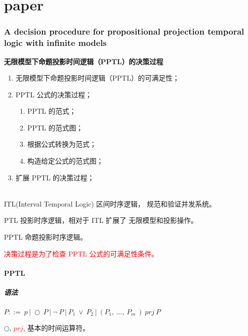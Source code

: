 \part{paper}

\section{A decision procedure for propositional projection
temporal logic with infinite models}
\textbf{无限模型下命题投影时间逻辑（PPTL）的决策过程}

\begin{enumerate}[(1)]
  \item 无限模型下命题投影时间逻辑（PPTL）的可满足性；
  \item PPTL 公式的决策过程；
  \begin{enumerate}
    \item PPTL 的范式；
    \item PPTL 的范式图；
    \item 根据公式转换为范式；
    \item 构造给定公式的范式图；
  \end{enumerate}
  \item 扩展 PPTL 的决策过程；
\end{enumerate}

\noindent
{}\\
\noindent ITL(Interval Temporal Logic) 区间时序逻辑， 规范和验证并发系统。

\noindent PTL 投影时序逻辑，相对于 ITL 扩展了 无限模型和投影操作。

\noindent PPTL 命题投影时序逻辑。


\noindent\textcolor{red}{决策过程是为了检查 PPTL 公式的可满足性条件。}


\subsection{PPTL}
\subsubsection{语法}
$P : :=~p~|~\bigcirc ~P~| ~\neg ~P~\left|~P_{1}~ \vee ~P_{2}~\right|~\left(P_{1},~ \ldots,~ P_{m}~\right) ~prj ~P$

$\bigcirc$, \textcolor{red}{$prj$}, 基本的时间运算符。


\noindent
{}\\
